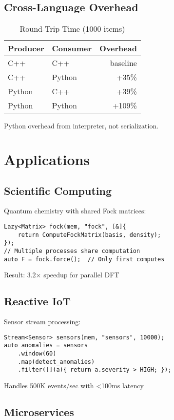 \documentclass[sigconf,anonymous]{acmart}
\begin{document}
\subsection{Cross-Language Overhead}

\begin{table}[h]
\centering
\caption{Round-Trip Time (1000 items)}
\label{tab:interop}
\begin{tabular}{llr}
\toprule
Producer & Consumer & Overhead \\
\midrule
C++ & C++ & baseline \\
C++ & Python & +35\% \\
Python & C++ & +39\% \\
Python & Python & +109\% \\
\bottomrule
\end{tabular}
\end{table}

Python overhead from interpreter, not serialization.

\section{Applications}

\subsection{Scientific Computing}

Quantum chemistry with shared Fock matrices:
\begin{lstlisting}
Lazy<Matrix> fock(mem, "fock", [&]{
    return ComputeFockMatrix(basis, density);
});
// Multiple processes share computation
auto F = fock.force();  // Only first computes
\end{lstlisting}
Result: 3.2× speedup for parallel DFT

\subsection{Reactive IoT}

Sensor stream processing:
\begin{lstlisting}
Stream<Sensor> sensors(mem, "sensors", 10000);
auto anomalies = sensors
    .window(60)
    .map(detect_anomalies)
    .filter([](a){ return a.severity > HIGH; });
\end{lstlisting}
Handles 500K events/sec with <100ms latency

\subsection{Microservices}
\end{document}
